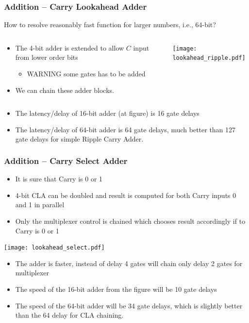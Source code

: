 \documentclass{beamer}
\begin{document}
\begin{frame}
\frametitle{Addition -- Carry Lookahead Adder}

How to resolve reasonably fast function for larger numbers, i.e., 64-bit?

\begin{columns}
\begin{column}{0.45\textwidth}
\begin{itemize}
\item The 4-bit adder is extended to allow $C$ input from lower order bits
\begin{itemize}
\item WARNING some gates has to be added
\end{itemize}
\item We can chain these adder blocks.
\end{itemize}
\end{column}
\begin{column}{0.55\textwidth}
\begin{center}
   \texttt{[image: lookahead\_ripple.pdf]}
\end{center}
\end{column}
\end{columns}


\begin{itemize}
\item The latency/delay of 16-bit adder (at figure) is 16 gate delays
\item The latency/delay of 64-bit adder is 64 gate delays, much better than 127 gate delays for simple Ripple Carry Adder.
\end{itemize}

\end{frame}


\begin{frame}
\frametitle{Addition -- Carry Select Adder}

\begin{itemize}
\item It is sure that Carry is 0 or 1
\item 4-bit CLA can be doubled and result is computed for both Carry inputs 0 and 1 in parallel
\item Only the multiplexer control is chained which chooses result accordingly if to Carry is 0 or 1
\end{itemize}
\begin{center}
   \texttt{[image: lookahead\_select.pdf]}
\end{center}

\begin{itemize}
\item The adder is faster, instead of delay 4 gates will chain only delay 2 gates for multiplexer
\item The speed of the 16-bit adder from the figure will be 10 gate delays
\item The speed of the 64-bit adder will be 34 gate delays, which is slightly better than the 64 delay for CLA chaining.
\end{itemize}

\end{frame}
\end{document}
